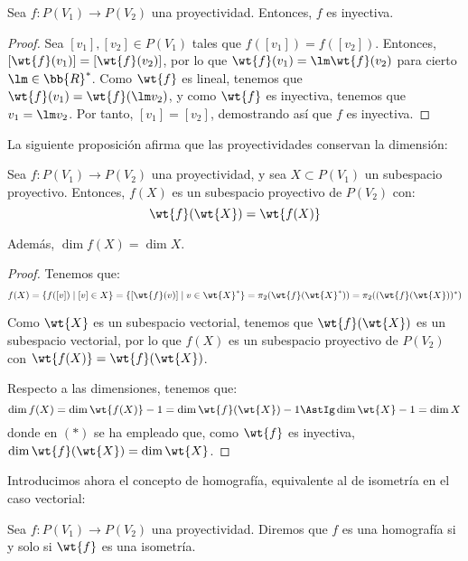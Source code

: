 \begin{prop}
    Sea $f:P(V_1)\to P(V_2)$ una proyectividad. Entonces, $f$ es inyectiva.
\end{prop}
\begin{proof}
    Sea $[v_1],[v_2]\in P(V_1)$ tales que $f([v_1])=f([v_2])$. Entonces, $[\wt{f}(v_1)]=[\wt{f}(v_2)]$, por lo que $\wt{f}(v_1)=\lm \wt{f}(v_2)$ para cierto $\lm \in \bb{R}^\ast$.
    Como $\wt{f}$ es lineal, tenemos que $\wt{f}(v_1) = \wt{f}(\lm v_2)$, y como $\wt{f}$ es inyectiva, tenemos que $v_1 = \lm v_2$. Por tanto, $[v_1]=[v_2]$, demostrando así que $f$ es inyectiva.
\end{proof}




La siguiente proposición afirma que las proyectividades conservan la dimensión:
\begin{prop}
    Sea $f:P(V_1)\to P(V_2)$ una proyectividad, y sea $X\subset P(V_1)$ un subespacio proyectivo. Entonces, $f(X)$ es un subespacio proyectivo de $P(V_2)$ con:
    \begin{equation*}
        \wt{f}(\wt{X}) = \wt{f(X)}
    \end{equation*}

    Además, $\dim f(X) = \dim X$.
\end{prop}
\begin{proof}
    Tenemos que: $$f(X)=\{f([v]) \mid [v]\in X\} = \{[\wt{f}(v)] \mid v\in \wt{X}^\ast\} = \pi_2(\wt{f}(\wt{X}^\ast)) = \pi_2((\wt{f}(\wt{X}))^\ast)$$

    Como $\wt{X}$ es un subespacio vectorial, tenemos que $\wt{f}(\wt{X})$ es un subespacio vectorial, por lo que $f(X)$ es un subespacio proyectivo de $P(V_2)$ con $\wt{f(X)}=\wt{f}(\wt{X})$.

    Respecto a las dimensiones, tenemos que: $$\dim f(X) = \dim \wt{f(X)} - 1 = \dim \wt{f}(\wt{X}) - 1 \AstIg \dim \wt{X} - 1 = \dim X$$
    donde en $(\ast)$ se ha empleado que, como $\wt{f}$ es inyectiva, $\dim \wt{f}(\wt{X}) = \dim \wt{X}$.




\end{proof}

Introducimos ahora el concepto de homografía, equivalente al de isometría en el caso vectorial:
\begin{definicion}[Homografía]
    Sea $f:P(V_1)\to P(V_2)$ una proyectividad. Diremos que $f$ es una homografía si y solo si $\wt{f}$ es una isometría.
\end{definicion}

